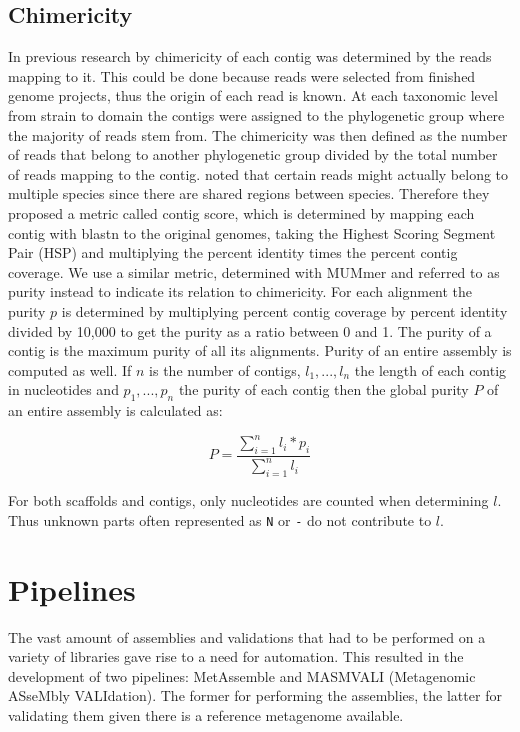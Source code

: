 \documentclass[a4paper,12pt]{report}
\begin{document}
\subsection{Chimericity}
\label{sec:chimer}
In previous research by \citet{Mavromatis17468765} chimericity of
each contig was determined by the reads mapping to it. This could be done
because reads were selected from finished genome projects, thus 
the origin of each read is known. At each taxonomic level from strain to domain the
contigs were assigned to the phylogenetic group where the majority of reads
stem from. The chimericity was then defined as the number of
reads that belong to another phylogenetic group divided by the total number of
reads mapping to the contig.  \citet{Mende22384016} noted that certain
reads might actually belong to multiple species since there are shared regions between species.
Therefore they proposed a metric called contig score, which is determined by mapping
each contig with blastn to the original genomes, taking the Highest Scoring
Segment Pair (HSP) and multiplying the percent identity times the percent
contig coverage. We use a similar metric, determined with MUMmer
and referred to as purity instead to indicate its relation to chimericity. For
each alignment the purity $p$ is determined by multiplying percent contig
coverage by percent identity divided by 10,000 to get the purity as a ratio
between 0 and 1. The purity of a contig is the maximum purity of all its
alignments. Purity of an entire assembly is computed as well. If $n$ is the
number of contigs, $l_1,...,l_n$ the length of each contig in nucleotides and
$p_1,...,p_n$ the purity of each contig then the global purity $P$ of an entire
assembly is calculated as:

\begin{equation}
P = \frac{\sum_{i=1}^n l_{i} * p_{i}}{\sum_{i=1}^{n} l_{i}}
\end{equation}

For both scaffolds and contigs, only nucleotides are counted when determining
$l$. Thus unknown parts often represented as \verb!N! or \verb!-! do not
contribute to $l$.\\


\section{Pipelines} The vast amount of assemblies and validations that had to
be performed on a variety of libraries gave rise to a need for automation. This
resulted in the development of two pipelines: MetAssemble and MASMVALI
(Metagenomic ASseMbly VALIdation). The former for performing the assemblies,
the latter for validating them given there is a reference metagenome available.
\end{document}
